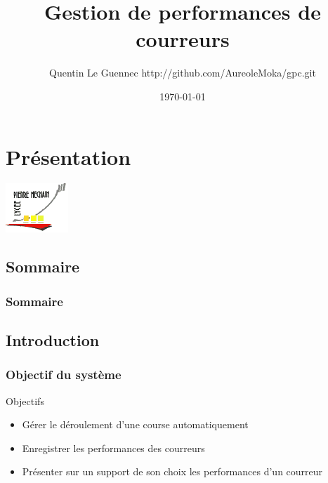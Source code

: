 \documentclass[10pt,handout,usepdftitle=false,envcountsect]{beamer}
\title{Gestion de performances de courreurs}
\author{Quentin Le Guennec \newline http://github.com/AureoleMoka/gpc.git}
\institute{Lycée Pierre Méchain Laon}
\date{\today}
\begin{document}
\section{Présentation}

\begin{frame}
\centering\includegraphics[scale=1]{pierre-mechain.png}
\maketitle
\end{frame}

\subsection{Sommaire}
\frametitle{Sommaire}
\begin{frame}
\tableofcontents
\end{frame}

\subsection{Introduction}
\begin{frame}
\frametitle{Objectif du système}
\begin{block}{Objectifs}
\begin{itemize}
\item Gérer le déroulement d'une course automatiquement
\item Enregistrer les performances des courreurs
\item Présenter sur un support de son choix les performances d'un courreur
\end{itemize}
\end{block}
\end{frame}
\end{document}

